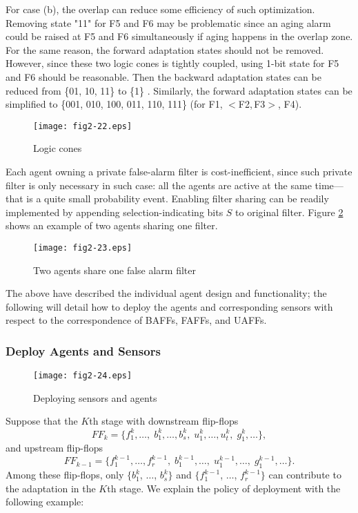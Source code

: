 For case (b), the overlap can reduce some efficiency of such optimization. Removing state "11" for F5 and F6 may be problematic since an aging alarm could be raised at F5 and F6 simultaneously if aging happens in the overlap zone. For the same reason, the forward adaptation states should not be removed. However, since these two logic cones is tightly coupled, using 1-bit state for F5 and F6 should be reasonable. Then the backward adaptation states can be reduced from \{01, 10, 11\} to \{1\} . Similarly, the forward adaptation states can be simplified to \{001, 010, 100, 011, 110, 111\} (for F1, $<$F2,\,F3$>$, F4).


\begin{figure}[t]
\centering
\texttt{[image: fig2-22.eps]}%
   \caption{Logic cones}\label{logiccone}
\end{figure}

Each agent owning a private false-alarm filter is cost-inefficient, since such private filter is only necessary in such case: all the agents are active at the same time---that is a quite small probability event. Enabling filter sharing  can be readily implemented by appending selection-indicating bits $S$ to original filter. Figure \ref{agent_share} shows an example of two agents sharing one filter.

\begin{figure}[t]
\centering
\texttt{[image: fig2-23.eps]}%
   \caption{Two agents share one false alarm filter}\label{agent_share}
\end{figure}


The above have described the individual agent design and functionality; the following will detail how to deploy the agents and corresponding sensors with respect to the correspondence of BAFFs, FAFFs, and UAFFs.

\subsubsection{Deploy Agents and Sensors}\label{deploy_agentsensor}
\begin{figure}[t]
\centering
\texttt{[image: fig2-24.eps]}%
   \caption{Deploying sensors and agents}\label{delpoy}
\end{figure}

Suppose that the $K$th stage with downstream flip-flops $$FF_{k}=\{f_1^{k}, \ldots,\; b_1^{k}, \ldots, b_s^{k}, \;u_1^{k}, \ldots, u_t^{k}, \;g_1^k, \ldots \}, $$ and upstream flip-flops $$FF_{k-1}=\{f_1^{k-1}, \ldots,  f_r^{k-1},\; b_1^{k-1}, \ldots, \;u_1^{k-1}, \ldots, \;g_1^{k-1}, \ldots \}.$$ Among these flip-flops, only $\{b_1^{k}$, $\ldots$, $b_s^{k}\}$ and $\{f_1^{k-1}$, $\ldots$, $f_r^{k-1}\}$ can contribute to the adaptation in the $K$th stage. We explain the policy of
deployment with the following example:

